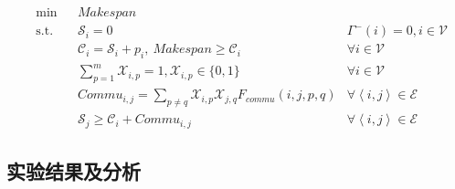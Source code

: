\begin{align}
	& \text{min} & & \mathit{Makespan} \label{eq:p-target-2-start} & \\
	& \text{s.t.} & & \mathcal{S}_{i}=0 &\Gamma^{-}(i)=0, i\in \mathcal{V} \\
	& & & \mathcal{C}_{i} = \mathcal{S}_{i} + \mathit{p}_i,\ \mathit{Makespan} \ge \mathcal{C}_{i} & \forall i\in \mathcal{V} \\
	& & & \sum_{p=1}^{m} \mathcal{X}_{i,p}=1, \mathcal{X}_{i,p}\in\{0,1\} & \forall i\in \mathcal{V} \\
	& & & \mathit{Commu}_{i,j} = \sum_{p\neq q}\mathcal{X}_{i,p}\mathcal{X}_{j,q}F_{\mathit{commu}}(i,j,p,q) & \forall \left\langle i,j\right\rangle \in \mathcal{E} \\
	& & & \mathcal{S}_{j} \ge \mathcal{C}_{i} + \mathit{Commu}_{i,j}&\forall \left\langle i,j\right\rangle \in \mathcal{E} \label{eq:p-target-2-end}
\end{align}







\subsection{实验结果及分析}


